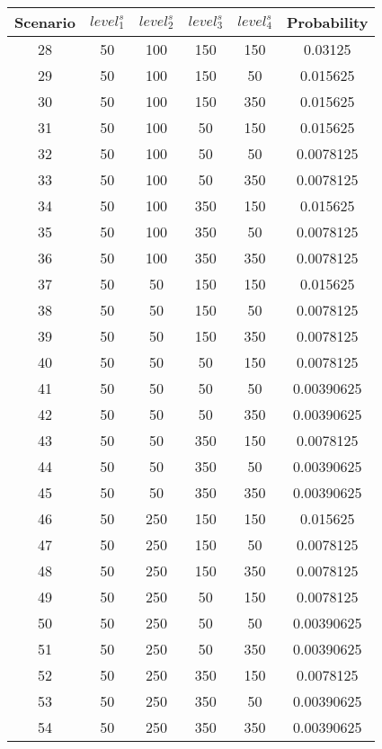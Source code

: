 \documentclass{article}
\begin{document}
\begin{table}[ht]
        \centering
        \begin{tabular}{|c|c c c c|c|}
                \hline
                Scenario & \(level_{1}^{s}\) & \(level_{2}^{s}\) & \(level_{3}^{s}\) & \(level_{4}^{s}\) & Probability\\
                \hline
                28 & 50 & 100 & 150 & 150 & 0.03125\\\hline
                29 & 50 & 100 & 150 & 50 & 0.015625\\\hline
                30 & 50 & 100 & 150 & 350 & 0.015625\\\hline
                31 & 50 & 100 & 50 & 150 & 0.015625\\\hline
                32 & 50 & 100 & 50 & 50 & 0.0078125\\\hline
                33 & 50 & 100 & 50 & 350 & 0.0078125\\\hline
                34 & 50 & 100 & 350 & 150 & 0.015625\\\hline
                35 & 50 & 100 & 350 & 50 & 0.0078125\\\hline
                36 & 50 & 100 & 350 & 350 & 0.0078125\\\hline
                37 & 50 & 50 & 150 & 150 & 0.015625\\\hline
                38 & 50 & 50 & 150 & 50 & 0.0078125\\\hline
                39 & 50 & 50 & 150 & 350 & 0.0078125\\\hline
                40 & 50 & 50 & 50 & 150 & 0.0078125\\\hline
                41 & 50 & 50 & 50 & 50 & 0.00390625\\\hline
                42 & 50 & 50 & 50 & 350 & 0.00390625\\\hline
                43 & 50 & 50 & 350 & 150 & 0.0078125\\\hline
                44 & 50 & 50 & 350 & 50 & 0.00390625\\\hline
                45 & 50 & 50 & 350 & 350 & 0.00390625\\\hline
                46 & 50 & 250 & 150 & 150 & 0.015625\\\hline
                47 & 50 & 250 & 150 & 50 & 0.0078125\\\hline
                48 & 50 & 250 & 150 & 350 & 0.0078125\\\hline
                49 & 50 & 250 & 50 & 150 & 0.0078125\\\hline
                50 & 50 & 250 & 50 & 50 & 0.00390625\\\hline
                51 & 50 & 250 & 50 & 350 & 0.00390625\\\hline
                52 & 50 & 250 & 350 & 150 & 0.0078125\\\hline
                53 & 50 & 250 & 350 & 50 & 0.00390625\\\hline
                54 & 50 & 250 & 350 & 350 & 0.00390625\\\hline
        \end{tabular}
\end{table}
\end{document}
